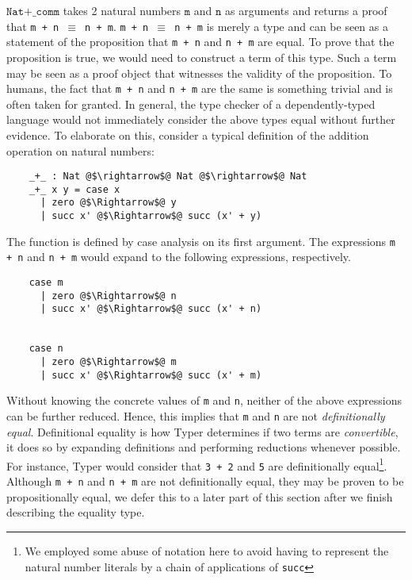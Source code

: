 \documentclass[12pt,twoside,maitrise]{dms}
\theoremstyle{definition}
\numberwithin{equation}{section}
\numberwithin{table}{chapter}
\numberwithin{figure}{chapter}
\newcommand\id[1] {\texttt{#1}}
\newcommand\fn[1] {\texttt{#1}}
\begin{document}
$\fn{Nat+\_comm}$ takes 2 natural numbers $\fn{m}$ and $\fn{n}$ as arguments
and returns a proof that \fn{m + n $\equiv$ n + m}. \fn{m + n $\equiv$ n + m}
is merely a type and can be seen as a statement of the proposition that \fn{m +
n} and \fn{n + m} are equal. To prove that the proposition is true, we would
need to construct a term of this type. Such a term may be seen as a proof
object that witnesses the validity of the proposition. To humans, the fact that
\fn{m + n} and \fn{n + m} are the same is something trivial and is often taken
for granted. In general, the type checker of a dependently-typed language would
not immediately consider the above types equal without further evidence. To
elaborate on this, consider a typical definition of the addition operation on
natural numbers:

\begin{verbatim}
    _+_ : Nat @$\rightarrow$@ Nat @$\rightarrow$@ Nat
    _+_ x y = case x
      | zero @$\Rightarrow$@ y
      | succ x' @$\Rightarrow$@ succ (x' + y)
\end{verbatim}

The function is defined by case analysis on its first argument. The expressions
\fn{m + n} and \fn{n + m} would expand to the following expressions,
respectively.

\begin{verbatim}
    case m
      | zero @$\Rightarrow$@ n
      | succ x' @$\Rightarrow$@ succ (x' + n)


    case n
      | zero @$\Rightarrow$@ m
      | succ x' @$\Rightarrow$@ succ (x' + m)
\end{verbatim}

Without knowing the concrete values of \id{m} and \id{n}, neither of the above
expressions can be further reduced. Hence, this implies that \id{m} and \id{n}
are not \emph{definitionally equal}. Definitional equality is how Typer
determines if two terms are \emph{convertible}, it does so by expanding
definitions and performing reductions whenever possible. For instance, Typer
would consider that \id{3 + 2} and \id{5} are definitionally equal\footnote{We
  employed some abuse of notation here to avoid having to represent the natural
number literals by a chain of applications of \id{succ}}. Although \fn{m + n}
and \fn{n + m} are not definitionally equal, they may be proven to be
propositionally equal, we defer this to a later part of this section after we
finish describing the equality type.
\end{document}
